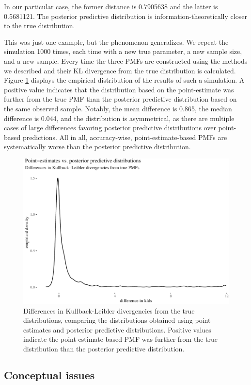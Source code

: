 \documentclass[
  10pt,
  dvipsnames,enabledeprecatedfontcommands]{scrartcl}
\begin{document}
In our particular case, the former distance is 0.7905638 and the latter
is 0.5681121. The posterior predictive distribution is
information-theoretically closer to the true distribution.

This was just one example, but the phenomenon generalizes. We repeat the
simulation 1000 times, each time with a new true parameter, a new sample
size, and a new sample. Every time the three PMFs are constructed using
the methods we described and their KL divergence from the true
distribution is calculated. Figure \ref{fig:kldsPlots} displays the
empirical distribution of the results of such a simulation. A positive
value indicates that the distribution based on the point-estimate was
further from the true PMF than the posterior predictive distribution
based on the same observed sample. Notably, the mean difference is
0.865, the median difference is 0.044, and the distribution is
asymmetrical, as there are multiple cases of large differences favoring
posterior predictive distributions over point-based predictions. All in
all, accuracy-wise, point-estimate-based PMFs are systematically worse
than the posterior predictive distribution.

\begin{figure}[H]

\begin{center}\includegraphics[width=0.7\linewidth]{paper-outline_files/figure-latex/fig:kldsPlots-1} \end{center}
\caption{Differences in Kullback-Leibler divergencies from the true distributions, comparing the distributions obtained using point estimates and posterior predictive distributions. Positive values indicate the point-estimate-based PMF was further from the true distribution than the posterior predictive distribution.}
\label{fig:kldsPlots}
\end{figure}

\hypertarget{conceptual-issues}{%
\subsection{Conceptual issues}\label{conceptual-issues}}
\end{document}
